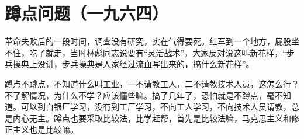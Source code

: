 \section[蹲点问题（一九六四）]{蹲点问题（一九六四）}


革命失败后的一段时间，调查没有研究，实在气得要死。红军到一个地方，屁股坐不住，吃了就走，当时林彪同志说要有“灵活战术”，大家反对说这叫新花样，“步兵操典上没讲，步兵操典是人家经过流血写出来的，搞什么新花样”。

蹲点不蹲点，不知道什么叫工业，一不请教工人，二不请教技术人员，这怎么行？不了解情况，为什么不学？应该懂些嘛。搞了几年了，恐怕就是不蹲点，毫不知道。可以到白银厂学习，没有到工厂学习，不向工人学习，不向技术人员请教，总是内心无主。蹲点也要采取比较法，比学赶帮，首先是比较法嘛，马克思主义和修正主义也是比较嘛。


